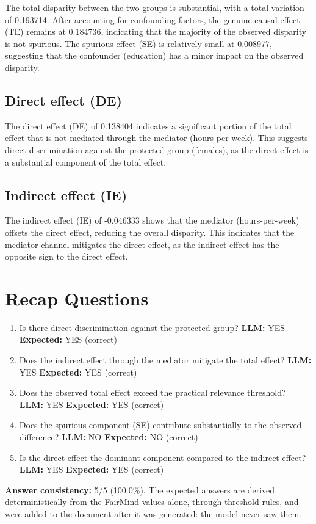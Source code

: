 \documentclass[11pt]{article}
\begin{document}
The total disparity between the two groups is substantial, with a total variation of 0.193714. After accounting for confounding factors, the genuine causal effect (TE) remains at 0.184736, indicating that the majority of the observed disparity is not spurious. The spurious effect (SE) is relatively small at 0.008977, suggesting that the confounder (education) has a minor impact on the observed disparity.

\subsection{Direct effect (DE)}

The direct effect (DE) of 0.138404 indicates a significant portion of the total effect that is not mediated through the mediator (hours-per-week). This suggests direct discrimination against the protected group (females), as the direct effect is a substantial component of the total effect.

\subsection{Indirect effect (IE)}

The indirect effect (IE) of -0.046333 shows that the mediator (hours-per-week) offsets the direct effect, reducing the overall disparity. This indicates that the mediator channel mitigates the direct effect, as the indirect effect has the opposite sign to the direct effect.

\section{Recap Questions}

\begin{enumerate}
\item Is there direct discrimination against the protected group? \textbf{LLM:} YES \quad \textbf{Expected:} YES \quad (correct)
\item Does the indirect effect through the mediator mitigate the total effect? \textbf{LLM:} YES \quad \textbf{Expected:} YES \quad (correct)
\item Does the observed total effect exceed the practical relevance threshold? \textbf{LLM:} YES \quad \textbf{Expected:} YES \quad (correct)
\item Does the spurious component (SE) contribute substantially to the observed difference? \textbf{LLM:} NO \quad \textbf{Expected:} NO \quad (correct)
\item Is the direct effect the dominant component compared to the indirect effect? \textbf{LLM:} YES \quad \textbf{Expected:} YES \quad (correct)
\end{enumerate}


\vspace{1em}
\noindent\textbf{Answer consistency:} 5/5 (100.0\%). The expected answers are derived deterministically from the FairMind values alone, through threshold rules, and were added to the document after it was generated: the model never saw them.
\end{document}
